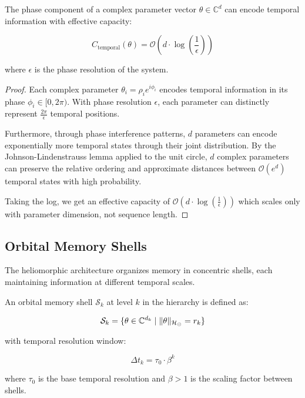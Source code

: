 \begin{theorem}
The phase component of a complex parameter vector $\theta \in \mathbb{C}^d$ can encode temporal information with effective capacity:

\begin{equation}
C_{\text{temporal}}(\theta) = \mathcal{O}(d \cdot \log(\frac{1}{\epsilon}))
\end{equation}

where $\epsilon$ is the phase resolution of the system.
\end{theorem}

\begin{proof}
Each complex parameter $\theta_i = \rho_i e^{i\phi_i}$ encodes temporal information in its phase $\phi_i \in [0, 2\pi)$. With phase resolution $\epsilon$, each parameter can distinctly represent $\frac{2\pi}{\epsilon}$ temporal positions.

Furthermore, through phase interference patterns, $d$ parameters can encode exponentially more temporal states through their joint distribution. By the Johnson-Lindenstrauss lemma applied to the unit circle, $d$ complex parameters can preserve the relative ordering and approximate distances between $\mathcal{O}(e^{d})$ temporal states with high probability.

Taking the log, we get an effective capacity of $\mathcal{O}(d \cdot \log(\frac{1}{\epsilon}))$ which scales only with parameter dimension, not sequence length.
\end{proof}

\subsection{Orbital Memory Shells}

The heliomorphic architecture organizes memory in concentric shells, each maintaining information at different temporal scales.

\begin{definition}
An orbital memory shell $\mathcal{S}_k$ at level $k$ in the hierarchy is defined as:

\begin{equation}
\mathcal{S}_k = \{\theta \in \mathbb{C}^{d_k} \mid \|\theta\|_{\mathcal{H}_{\odot}} = r_k\}
\end{equation}

with temporal resolution window:

\begin{equation}
\Delta t_k = \tau_0 \cdot \beta^k
\end{equation}

where $\tau_0$ is the base temporal resolution and $\beta > 1$ is the scaling factor between shells.
\end{definition}

